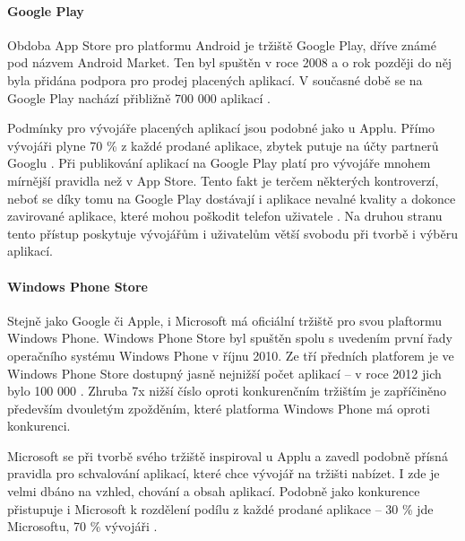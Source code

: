 \paragraph{Google Play}
Obdoba App Store pro platformu Android je tržiště Google Play, dříve známé pod názvem Android Market. Ten byl spuštěn v roce 2008 a o rok později do něj byla přidána podpora pro prodej placených aplikací. V současné době se na Google Play nachází přibližně 700 000 aplikací \cite{google_says_700k_apps}.

Podmínky pro vývojáře placených aplikací jsou podobné jako u Applu. Přímo vývojáři plyne 70 \% z každé prodané aplikace, zbytek putuje na účty partnerů Googlu \cite{transaction_fees_android}. Při publikování aplikací na Google Play platí pro vývojáře mnohem mírnější pravidla než v App Store. Tento fakt je terčem některých kontroverzí, neboť se díky tomu na Google Play dostávají i aplikace nevalné kvality a dokonce zavirované aplikace, které mohou poškodit telefon uživatele \cite{new_android_trojan}. Na druhou stranu tento přístup poskytuje vývojářům i uživatelům větší svobodu při tvorbě i výběru aplikací.

\paragraph{Windows Phone Store}
Stejně jako Google či Apple, i Microsoft má oficiální tržiště pro svou plaftormu Windows Phone. Windows Phone Store byl spuštěn spolu s uvedením první řady operačního systému Windows Phone v říjnu 2010. Ze tří předních platforem je ve Windows Phone Store dostupný jasně nejnižší počet aplikací – v roce 2012 jich bylo 100 000 \cite{mobile_app_usage_statistics}. Zhruba 7x nižší číslo oproti konkurenčním tržištím je zapříčiněno především dvouletým zpožděním, které platforma Windows Phone má oproti konkurenci.

Microsoft se při tvorbě svého tržiště inspiroval u Applu a zavedl podobně přísná pravidla pro schvalování aplikací, které chce vývojář na tržišti nabízet. I zde je velmi dbáno na vzhled, chování a obsah aplikací. Podobně jako konkurence přistupuje i Microsoft k rozdělení podílu z každé prodané aplikace – 30 \% jde Microsoftu, 70 \% vývojáři \cite{wp_right_mix}.

